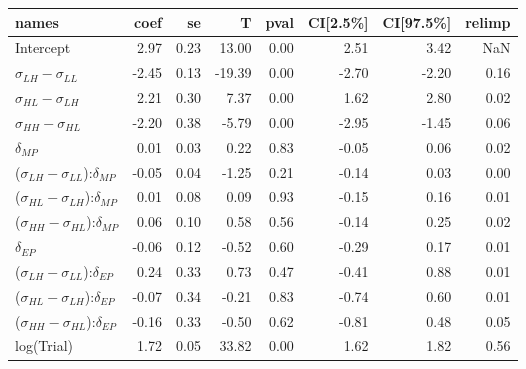 

\begin{tabular}{lrrrrrrr}
\toprule
                                      names &  coef &   se &      T &  pval &  CI[2.5\%] &  CI[97.5\%] &  relimp \\
\midrule
                                  Intercept &  2.97 & 0.23 &  13.00 &  0.00 &       2.51 &        3.42 &     NaN \\
                $\sigma_{LH} - \sigma_{LL}$ & -2.45 & 0.13 & -19.39 &  0.00 &      -2.70 &       -2.20 &    0.16 \\
                $\sigma_{HL} - \sigma_{LH}$ &  2.21 & 0.30 &   7.37 &  0.00 &       1.62 &        2.80 &    0.02 \\
                $\sigma_{HH} - \sigma_{HL}$ & -2.20 & 0.38 &  -5.79 &  0.00 &      -2.95 &       -1.45 &    0.06 \\
                              $\delta_{MP}$ &  0.01 & 0.03 &   0.22 &  0.83 &      -0.05 &        0.06 &    0.02 \\
($\sigma_{LH} - \sigma_{LL}$):$\delta_{MP}$ & -0.05 & 0.04 &  -1.25 &  0.21 &      -0.14 &        0.03 &    0.00 \\
($\sigma_{HL} - \sigma_{LH}$):$\delta_{MP}$ &  0.01 & 0.08 &   0.09 &  0.93 &      -0.15 &        0.16 &    0.01 \\
($\sigma_{HH} - \sigma_{HL}$):$\delta_{MP}$ &  0.06 & 0.10 &   0.58 &  0.56 &      -0.14 &        0.25 &    0.02 \\
                              $\delta_{EP}$ & -0.06 & 0.12 &  -0.52 &  0.60 &      -0.29 &        0.17 &    0.01 \\
($\sigma_{LH} - \sigma_{LL}$):$\delta_{EP}$ &  0.24 & 0.33 &   0.73 &  0.47 &      -0.41 &        0.88 &    0.01 \\
($\sigma_{HL} - \sigma_{LH}$):$\delta_{EP}$ & -0.07 & 0.34 &  -0.21 &  0.83 &      -0.74 &        0.60 &    0.01 \\
($\sigma_{HH} - \sigma_{HL}$):$\delta_{EP}$ & -0.16 & 0.33 &  -0.50 &  0.62 &      -0.81 &        0.48 &    0.05 \\
                                 log(Trial) &  1.72 & 0.05 &  33.82 &  0.00 &       1.62 &        1.82 &    0.56 \\
\bottomrule
\end{tabular}



